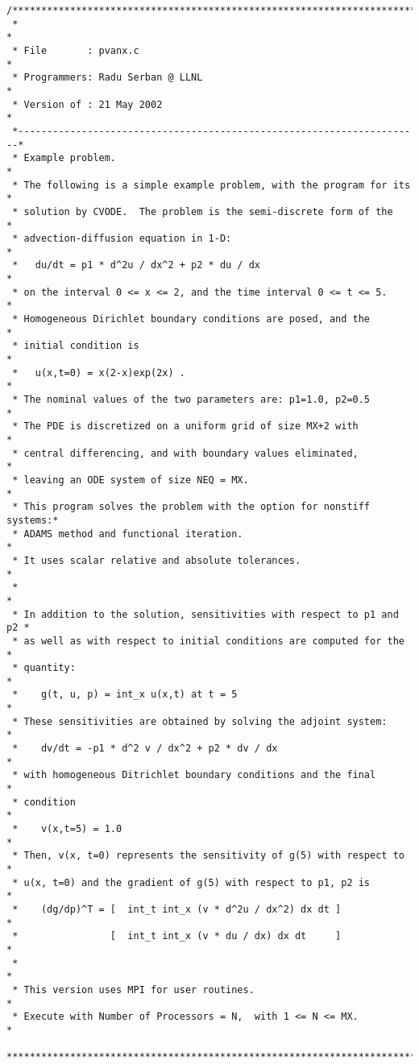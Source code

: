 \begin{verbatim}
/************************************************************************
 *                                                                      *
 * File       : pvanx.c                                                 *
 * Programmers: Radu Serban @ LLNL                                      *
 * Version of : 21 May 2002                                             *
 *----------------------------------------------------------------------*
 * Example problem.                                                     *
 * The following is a simple example problem, with the program for its  *
 * solution by CVODE.  The problem is the semi-discrete form of the     *
 * advection-diffusion equation in 1-D:                                 *
 *   du/dt = p1 * d^2u / dx^2 + p2 * du / dx                            *
 * on the interval 0 <= x <= 2, and the time interval 0 <= t <= 5.      *
 * Homogeneous Dirichlet boundary conditions are posed, and the         *
 * initial condition is                                                 *
 *   u(x,t=0) = x(2-x)exp(2x) .                                         *
 * The nominal values of the two parameters are: p1=1.0, p2=0.5         *
 * The PDE is discretized on a uniform grid of size MX+2 with           *
 * central differencing, and with boundary values eliminated,           *
 * leaving an ODE system of size NEQ = MX.                              *
 * This program solves the problem with the option for nonstiff systems:*
 * ADAMS method and functional iteration.                               *
 * It uses scalar relative and absolute tolerances.                     *
 *                                                                      *
 * In addition to the solution, sensitivities with respect to p1 and p2 *
 * as well as with respect to initial conditions are computed for the   *
 * quantity:                                                            *
 *    g(t, u, p) = int_x u(x,t) at t = 5                                *
 * These sensitivities are obtained by solving the adjoint system:      *
 *    dv/dt = -p1 * d^2 v / dx^2 + p2 * dv / dx                         *
 * with homogeneous Ditrichlet boundary conditions and the final        *
 * condition                                                            *
 *    v(x,t=5) = 1.0                                                    *
 * Then, v(x, t=0) represents the sensitivity of g(5) with respect to   *
 * u(x, t=0) and the gradient of g(5) with respect to p1, p2 is         *
 *    (dg/dp)^T = [  int_t int_x (v * d^2u / dx^2) dx dt ]              *
 *                [  int_t int_x (v * du / dx) dx dt     ]              *
 *                                                                      *
 * This version uses MPI for user routines.                             *
 * Execute with Number of Processors = N,  with 1 <= N <= MX.           *
 ************************************************************************/


\end{verbatim}

